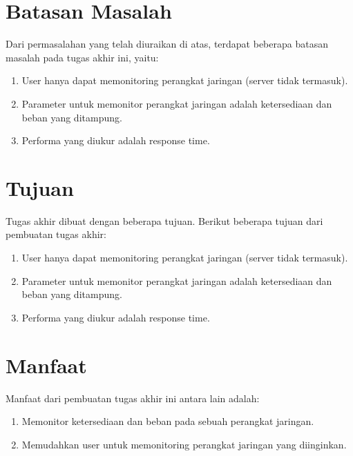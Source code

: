 	\section{Batasan Masalah}
		Dari permasalahan yang telah diuraikan di atas, terdapat beberapa batasan masalah pada tugas akhir ini, yaitu:
		\begin{enumerate}
			\item User hanya dapat memonitoring perangkat jaringan (server tidak termasuk).
            \item Parameter untuk memonitor perangkat jaringan adalah ketersediaan dan beban yang ditampung.
            \item Performa yang diukur adalah response time.
		\end{enumerate}

	\section{Tujuan}
       	Tugas akhir dibuat dengan beberapa tujuan. Berikut beberapa tujuan dari pembuatan tugas akhir:
       	\begin{enumerate}
       		\item User hanya dapat memonitoring perangkat jaringan (server tidak termasuk).
       		\item Parameter untuk memonitor perangkat jaringan adalah ketersediaan dan beban yang ditampung.
       		\item Performa yang diukur adalah response time.
       	\end{enumerate}
        
	\section{Manfaat}
		Manfaat dari pembuatan tugas akhir ini antara lain adalah:
		\begin{enumerate}
			\item Memonitor ketersediaan dan beban pada sebuah perangkat jaringan.
			\item Memudahkan user untuk memonitoring perangkat jaringan yang diinginkan.
		\end{enumerate}
